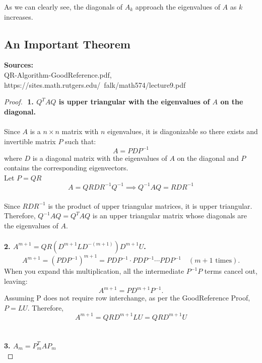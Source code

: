 \documentclass[12pt]{article}
\begin{document}
As we can clearly see, the diagonals of $A_k$ approach the eigenvalues of $A$ as $k$ increases.


\subsection{An Important Theorem}
\textbf{Sources: }\\
    QR-Algorithm-GoodReference.pdf, \\
    https://sites.math.rutgers.edu/~falk/math574/lecture9.pdf
    \begin{proof} $ $\newline
        \textbf{1. $Q^TAQ$ is upper triangular with the eigenvalues of $A$ on the diagonal.} \\\\
        Since $A$ is a $n \times n$ matrix with $n$ eigenvalues, it is diagonizable so there exists and invertible matrix $P$ such that: \\
        $$A = PDP^{-1}$$
        where $D$ is a diagonal matrix with the eigenvalues of $A$ on the diagonal and $P$ contains the corresponding eigenvectors. \\
        Let $P=QR$
        \[
        A = QR D R^{-1}Q^{-1} \implies Q^{-1}AQ = R D R^{-1}
        \]\\
        Since $RDR^{-1}$ is the product of upper triangular matrices, it is upper triangular. Therefore, $Q^{-1}AQ = Q^TAQ$ is 
        an upper triangular matrix whose diagonals are the eigenvalues of $A$.\\\\
        \textbf{2. $A^{m+1} = QR (D^{m+1} L D^{-(m+1)})D^{m+1}U$.} \\
        \[
        A^{m+1} = (PDP^{-1})^{m+1} = P D P^{-1} \cdot P D P^{-1} \cdots P D P^{-1} \quad (m + 1 \text{ times}).
        \]
        When you expand this multiplication, all the intermediate \( P^{-1}P \) terms cancel out, leaving:
        \[
        A^{m+1} = P D^{m+1} P^{-1}.
        \]
        Assuming P does not require row interchange, as per the GoodReference Proof, $P=LU$. Therefore, \\
        \[
        A^{m+1} = QR D^{m+1} LU = QR D^{m+1}U \tag{1}
        \] \\ \\
        \textbf{3. $A_m = P_m^TAP_m$} \\
       

\end{proof}
\end{document}

